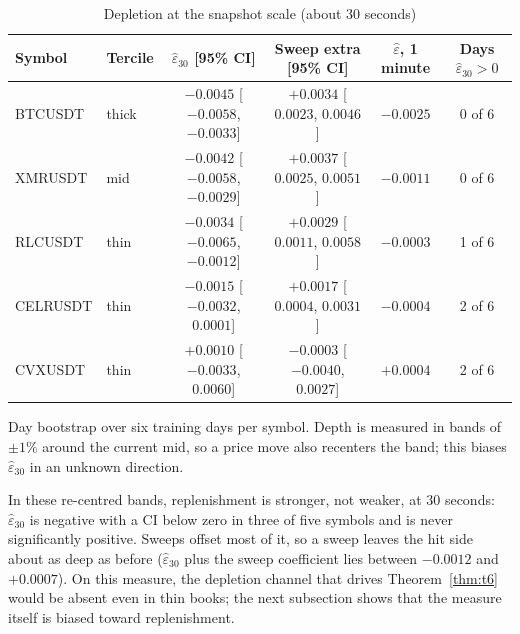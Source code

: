 \documentclass[12pt]{article}
\theoremstyle{definition}
\theoremstyle{remark}
\begin{document}
\begin{table}[t]\centering\small
\begin{threeparttable}
\caption{Depletion at the snapshot scale (about 30 seconds)}\label{tab:x8}
\setlength{\tabcolsep}{2.5pt}
\begin{tabular}{llcccc}
\toprule
Symbol & Tercile & $\hat\varepsilon_{30}$ [95\% CI] & Sweep extra [95\% CI] & $\hat\varepsilon$, 1 minute & Days $\hat\varepsilon_{30}>0$\\
\midrule
BTCUSDT & thick & $-0.0045$ [$-0.0058$, $-0.0033$] & $+0.0034$ [$0.0023$, $0.0046$] & $-0.0025$ & 0 of 6\\
XMRUSDT & mid & $-0.0042$ [$-0.0058$, $-0.0029$] & $+0.0037$ [$0.0025$, $0.0051$] & $-0.0011$ & 0 of 6\\
RLCUSDT & thin & $-0.0034$ [$-0.0065$, $-0.0012$] & $+0.0029$ [$0.0011$, $0.0058$] & $-0.0003$ & 1 of 6\\
CELRUSDT & thin & $-0.0015$ [$-0.0032$, $0.0001$] & $+0.0017$ [$0.0004$, $0.0031$] & $-0.0004$ & 2 of 6\\
CVXUSDT & thin & $+0.0010$ [$-0.0033$, $0.0060$] & $-0.0003$ [$-0.0040$, $0.0027$] & $+0.0004$ & 2 of 6\\
\bottomrule
\end{tabular}
\begin{tablenotes}\footnotesize\item Day bootstrap over six training days per symbol. Depth is measured in bands of $\pm1\%$ around the current mid, so a price move also recenters the band; this biases $\hat\varepsilon_{30}$ in an unknown direction. \end{tablenotes}
\end{threeparttable}
\end{table}

In these re-centred bands, replenishment is stronger, not weaker, at 30 seconds: $\hat\varepsilon_{30}$ is negative with a CI below zero in three of five symbols and is never significantly positive. Sweeps offset most of it, so a sweep leaves the hit side about as deep as before ($\hat\varepsilon_{30}$ plus the sweep coefficient lies between $-0.0012$ and $+0.0007$). On this measure, the depletion channel that drives Theorem~\ref{thm:t6} would be absent even in thin books; the next subsection shows that the measure itself is biased toward replenishment.
\end{document}

